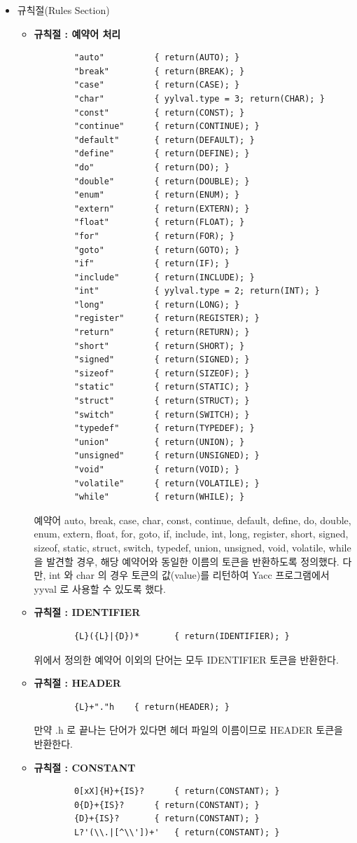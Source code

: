 \documentclass{article}
\begin{document}
\begin{itemize}
	\item 규칙절(Rules Section)	
	\begin{itemize}
		\item {\bf 규칙절 : 예약어 처리}
		\begin{lstlisting}
		"auto"			{ return(AUTO); }
		"break"			{ return(BREAK); }
		"case"			{ return(CASE); }
		"char"			{ yylval.type = 3; return(CHAR); }
		"const"			{ return(CONST); }
		"continue"		{ return(CONTINUE); }
		"default"		{ return(DEFAULT); }
		"define"		{ return(DEFINE); }
		"do"			{ return(DO); }
		"double"		{ return(DOUBLE); }
		"enum"			{ return(ENUM); }
		"extern"		{ return(EXTERN); }
		"float"			{ return(FLOAT); }
		"for"			{ return(FOR); }
		"goto"			{ return(GOTO); }
		"if"			{ return(IF); }
		"include"		{ return(INCLUDE); }
		"int"			{ yylval.type = 2; return(INT); }
		"long"			{ return(LONG); }
		"register"		{ return(REGISTER); }
		"return"		{ return(RETURN); }
		"short"			{ return(SHORT); }
		"signed"		{ return(SIGNED); }
		"sizeof"		{ return(SIZEOF); }
		"static"		{ return(STATIC); }
		"struct"		{ return(STRUCT); }
		"switch"		{ return(SWITCH); }
		"typedef"		{ return(TYPEDEF); }
		"union"			{ return(UNION); }
		"unsigned"		{ return(UNSIGNED); }
		"void"			{ return(VOID); }
		"volatile"		{ return(VOLATILE); }
		"while"			{ return(WHILE); }
		\end{lstlisting}
		예약어 auto, break, case, char, const, continue, default, define, do, double,
		enum, extern, float, for, goto, if, include, int, long, register, short, signed,
		sizeof, static, struct, switch, typedef, union, unsigned, void, volatile, while
		을 발견할 경우, 해당 예약어와 동일한 이름의 토큰을 반환하도록 정의했다. 다만, int 와 char 의 경우
		토큰의 값(value)를 리턴하여 Yacc 프로그램에서 yyval 로 사용할 수 있도록 했다.
		\item {\bf 규칙절 : IDENTIFIER}
		\begin{lstlisting}
		{L}({L}|{D})*		{ return(IDENTIFIER); }
		\end{lstlisting}
		위에서 정의한 예약어 이외의 단어는 모두 IDENTIFIER 토큰을 반환한다.

		\item {\bf 규칙절 : HEADER}
		\begin{lstlisting}
		{L}+"."h	{ return(HEADER); }
		\end{lstlisting}
		만약 .h 로 끝나는 단어가 있다면 헤더 파일의 이름이므로 HEADER 토큰을 반환한다.

		\item {\bf 규칙절 : CONSTANT}
		\begin{lstlisting}
		0[xX]{H}+{IS}?		{ return(CONSTANT); }
		0{D}+{IS}?		{ return(CONSTANT); }
		{D}+{IS}?		{ return(CONSTANT); }
		L?'(\\.|[^\\'])+'	{ return(CONSTANT); }
		

\end{lstlisting}
\end{itemize}
\end{itemize}
\end{document}

